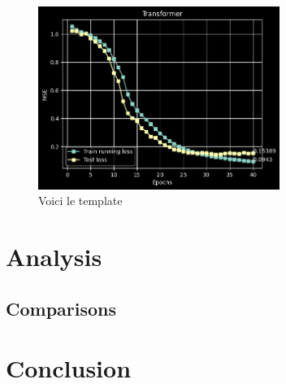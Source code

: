 \documentclass{article}
\begin{document}
\begin{figure} \label{fig:transformer_accuracy}
    \caption{Voici le template} \center
    \includegraphics[width=0.7\textwidth]{images/2023-04-02-13-48-49.png}
\end{figure}

\section{Analysis}


\subsection{Comparisons}

\section{Conclusion}



\end{document}
